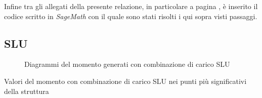 Infine tra gli allegati della presente relazione, in particolare a pagina \pageref{cap:codiceTrave}, è inserito il codice scritto in \emph{SageMath} con il quale sono stati risolti i qui sopra visti passaggi.
\clearpage	
\begin{landscape}
\subsection*{SLU}
\begin{figure}[H]
\centering
{} 
\caption{Diagrammi del momento generati con combinazione di carico SLU}
\label{fig:Momenti_ULS}
\end{figure}
\begin{table}[H]
\centering
\caption{Valori del momento con combinazione di carico SLU nei punti più significativi della struttura}

\end{table}
\end{landscape}

